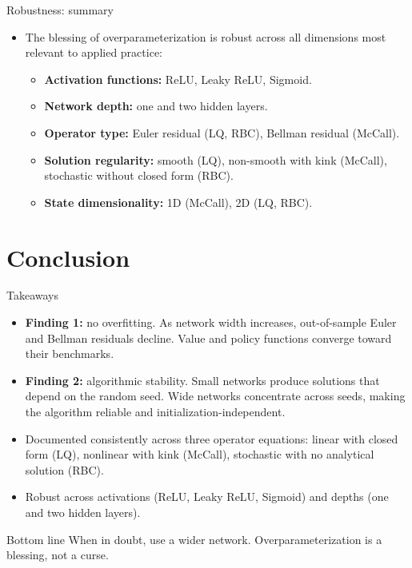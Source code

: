 \documentclass[aspectratio=169,10pt]{beamer}
\newcommand{\emphcolor}[1]{\textbf{\textcolor{emphcolorval}{#1}}}
\begin{document}
\begin{frame}{Robustness: summary}
	\vspace{0.1in}
	\begin{itemize}
		\item The blessing of overparameterization is robust across all dimensions most relevant to applied practice:
		\begin{itemize}
			\item \emphcolor{Activation functions:} ReLU, Leaky ReLU, Sigmoid.
			\item \emphcolor{Network depth:} one and two hidden layers.
			\item \emphcolor{Operator type:} Euler residual (LQ, RBC), Bellman residual (McCall).
			\item \emphcolor{Solution regularity:} smooth (LQ), non-smooth with kink (McCall), stochastic without closed form (RBC).
			\item \emphcolor{State dimensionality:} 1D (McCall), 2D (LQ, RBC).
		\end{itemize}
	\end{itemize}
\end{frame}

\section{\textcolor{KahouBlack}{Conclusion}}

\begin{frame}{Takeaways}
	\begin{itemize}
		\item \emphcolor{Finding 1:} no overfitting. As network width increases, out-of-sample Euler and Bellman residuals decline. Value and policy functions converge toward their benchmarks.
		\item \emphcolor{Finding 2:} algorithmic stability. Small networks produce solutions that depend on the random seed. Wide networks concentrate across seeds, making the algorithm reliable and initialization-independent.
		\item Documented consistently across three operator equations: linear with closed form (LQ), nonlinear with kink (McCall), stochastic with no analytical solution (RBC).
		\item Robust across activations (ReLU, Leaky ReLU, Sigmoid) and depths (one and two hidden layers).
	\end{itemize}
	\begin{block}{Bottom line}
		When in doubt, use a wider network. Overparameterization is a blessing, not a curse.
	\end{block}
\end{frame}
\end{document}
